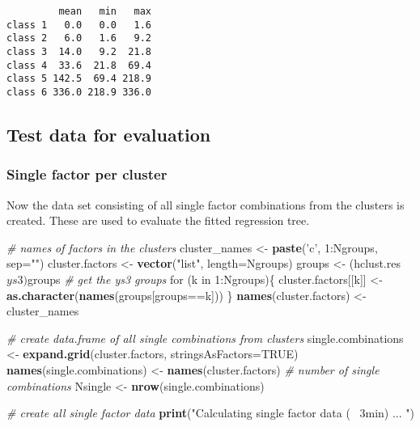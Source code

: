 \documentclass[]{article}
\newenvironment{Shaded}{\begin{snugshade}}{\end{snugshade}}
\newcommand{\KeywordTok}[1]{\textcolor[rgb]{0.13,0.29,0.53}{\textbf{{#1}}}}
\newcommand{\DataTypeTok}[1]{\textcolor[rgb]{0.13,0.29,0.53}{{#1}}}
\newcommand{\DecValTok}[1]{\textcolor[rgb]{0.00,0.00,0.81}{{#1}}}
\newcommand{\StringTok}[1]{\textcolor[rgb]{0.31,0.60,0.02}{{#1}}}
\newcommand{\CommentTok}[1]{\textcolor[rgb]{0.56,0.35,0.01}{\textit{{#1}}}}
\newcommand{\OtherTok}[1]{\textcolor[rgb]{0.56,0.35,0.01}{{#1}}}
\newcommand{\NormalTok}[1]{{#1}}
\begin{document}
\begin{verbatim}
         mean   min   max
class 1   0.0   0.0   1.6
class 2   6.0   1.6   9.2
class 3  14.0   9.2  21.8
class 4  33.6  21.8  69.4
class 5 142.5  69.4 218.9
class 6 336.0 218.9 336.0
\end{verbatim}

\subsection{Test data for evaluation}\label{test-data-for-evaluation}

\subsubsection{Single factor per
cluster}\label{single-factor-per-cluster}

Now the data set consisting of all single factor combinations from the
clusters is created. These are used to evaluate the fitted regression
tree.

\begin{Shaded}
\begin{Highlighting}[]
\CommentTok{# names of factors in the clusters}
\NormalTok{cluster_names <-}\StringTok{ }\KeywordTok{paste}\NormalTok{(}\StringTok{'c'}\NormalTok{, }\DecValTok{1}\NormalTok{:Ngroups, }\DataTypeTok{sep=}\StringTok{""}\NormalTok{)}
\NormalTok{cluster.factors <-}\StringTok{ }\KeywordTok{vector}\NormalTok{(}\StringTok{"list"}\NormalTok{, }\DataTypeTok{length=}\NormalTok{Ngroups)}
\NormalTok{groups <-}\StringTok{ }\NormalTok{(hclust.res$ys3)$groups  }\CommentTok{# get the ys3 groups}
\NormalTok{for (k in }\DecValTok{1}\NormalTok{:Ngroups)\{}
  \NormalTok{cluster.factors[[k]] <-}\StringTok{ }\KeywordTok{as.character}\NormalTok{(}\KeywordTok{names}\NormalTok{(groups[groups==k]))}
\NormalTok{\}}
\KeywordTok{names}\NormalTok{(cluster.factors) <-}\StringTok{ }\NormalTok{cluster_names}

\CommentTok{# create data.frame of all single combinations from clusters}
\NormalTok{single.combinations <-}\StringTok{ }\KeywordTok{expand.grid}\NormalTok{(cluster.factors, }\DataTypeTok{stringsAsFactors=}\OtherTok{TRUE}\NormalTok{)}
\KeywordTok{names}\NormalTok{(single.combinations) <-}\StringTok{ }\KeywordTok{names}\NormalTok{(cluster.factors)}
\CommentTok{# number of single combinations}
\NormalTok{Nsingle <-}\StringTok{ }\KeywordTok{nrow}\NormalTok{(single.combinations)}

\CommentTok{# create all single factor data}
\KeywordTok{print}\NormalTok{(}\StringTok{"Calculating single factor data (~ 3min) ... "}\NormalTok{)}
\end{Highlighting}
\end{Shaded}
\end{document}

